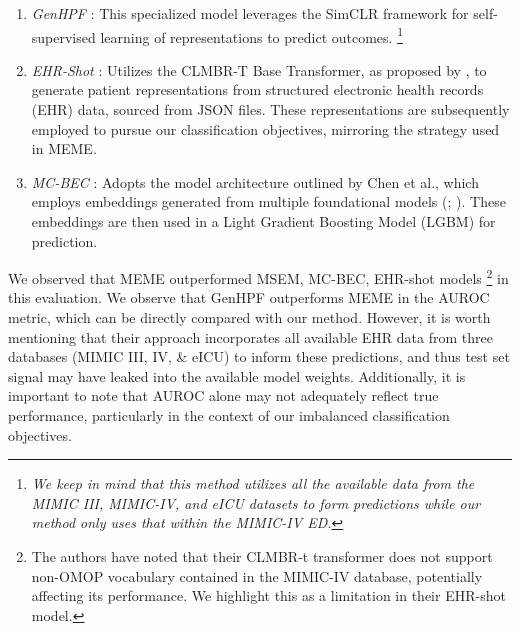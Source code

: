\documentclass[pmlr]{jmlr}%
\begin{document}
\begin{enumerate}
    \item \textit{GenHPF} \citep{hur2023genhpf}: This specialized model leverages the SimCLR framework for self-supervised learning of representations to predict outcomes. \footnote{\textit{We keep in mind that this method utilizes all the available data from the MIMIC III, MIMIC-IV, and eICU datasets to form predictions while our method only uses that within the MIMIC-IV ED.}}

    
    \item \textit{EHR-Shot} \citep{wornow2024ehrshot}: Utilizes the CLMBR-T Base Transformer, as proposed by \citep{steinberg2021language}, to generate patient representations from structured electronic health records (EHR) data, sourced from JSON files. These representations are subsequently employed to pursue our classification objectives, mirroring the strategy used in MEME.
    
    \item \textit{MC-BEC} \citep{chen2023multimodal}: Adopts the model architecture outlined by Chen et al., which employs embeddings generated from multiple foundational models (\cite{huang2019clinicalbert}; \cite{yan2022radbert}). These embeddings are then used in a Light Gradient Boosting Model (LGBM) for prediction.
\end{enumerate}
We observed that MEME outperformed  MSEM, MC-BEC, EHR-shot models \footnote{The authors have noted that their CLMBR-t transformer does not support non-OMOP vocabulary contained in the MIMIC-IV database, potentially affecting its performance. We highlight this as a limitation in their EHR-shot model.} in this evaluation. We observe that GenHPF outperforms MEME in the AUROC metric, which can be directly compared with our method. However, it is worth mentioning that their approach incorporates all available EHR data from three databases (MIMIC III, IV, \& eICU) to inform these predictions, and thus test set signal may have leaked into the available model weights. Additionally, it is important to note that AUROC alone may not adequately reflect true performance, particularly in the context of our imbalanced classification objectives.
\end{document}
